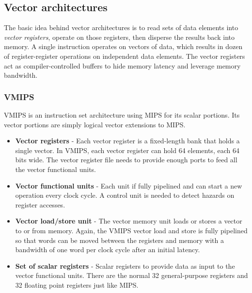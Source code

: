 \documentclass[11pt]{article}
\begin{document}
\subsection{Vector architectures}
The basic idea behind vector architectures is to read sets of data elements into \textit{vector registers}, operate on those registers, then disperse the results back into memory. A single instruction operates on vectors of data, which results in dozen of register-register operations on independent data elements. 
\n
The vector registers act as compiler-controlled buffers to hide memory latency and leverage memory bandwidth. 

\subsubsection{VMIPS}
VMIPS is an instruction set architecture using MIPS for its scalar portions. Its vector portions are simply logical vector extensions to MIPS. 
\begin{itemize}
\item \textbf{Vector registers} - Each vector register is a fixed-length bank that holds a single vector. In VMIPS, each vector register can hold 64 elements, each 64 bits wide. The vector register file needs to provide enough ports to feed all the vector functional units. 
\item \textbf{Vector functional units} - Each unit if fully pipelined and can start a new operation every clock cycle. A control unit is needed to detect hazards on register accesses. 
\item \textbf{Vector load/store unit} - The vector memory unit loads or stores a vector to or from memory. Again, the VMIPS vector load and store is fully pipelined so that words can be moved between the registers and memory with a bandwidth of one word per clock cycle after an initial latency. 
\item \textbf{Set of scalar registers} - Scalar registers to provide data as input to the vector functional units. There are the normal 32 general-purpose registers and 32 floating point registers just like MIPS. 
\end{itemize}
\end{document}
